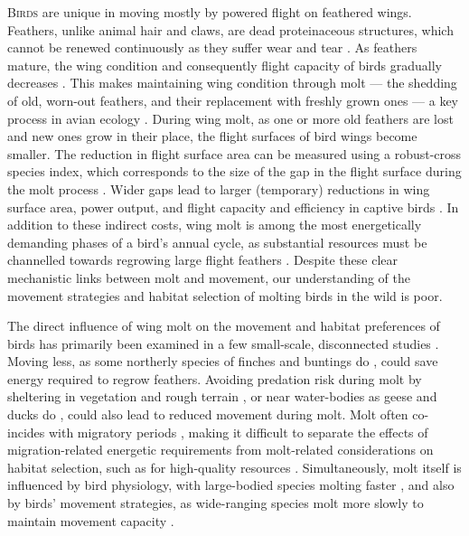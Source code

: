
\begin{refsection}

\newrefcontext[sorting=ynt]

\lettrine{B}{irds} are unique in moving mostly by powered flight on feathered wings.
Feathers, unlike animal hair and claws, are dead proteinaceous structures, which cannot be renewed continuously as they suffer wear and tear \cite{rayner1988,jenni1989}.
As feathers mature, the wing condition and consequently flight capacity of birds gradually decreases \cite{lindstrom1994,hedenstrom1999,hedenstrom2003}.
This makes maintaining wing condition through molt --- the shedding of old, worn-out feathers, and their replacement with freshly grown ones --- a key process in avian ecology \cite{ginn1983,rayner1988}.
During wing molt, as one or more old feathers are lost and new ones grow in their place, the flight surfaces of bird wings become smaller.
The reduction in flight surface area can be measured using a robust-cross species index, which corresponds to the size of the gap in the flight surface during the molt process \citep{lind2001,kiat2016}.
Wider gaps lead to larger (temporary) reductions in wing surface area, power output, and flight capacity and efficiency in captive birds \cite{tucker1991,swaddle1996,swaddle1997,williams2003,lind2001,lind2001a,bowlin2009}.
In addition to these indirect costs, wing molt is among the most energetically demanding phases of a bird's annual cycle, as substantial resources must be channelled towards regrowing large flight feathers \cite{lindstrom1993,newton2009,kiat2017}.
Despite these clear mechanistic links between molt and movement, our understanding of the movement strategies and habitat selection of molting birds in the wild is poor.

The direct influence of wing molt on the movement and habitat preferences of birds has primarily been examined in a few small-scale, disconnected studies \citep{bell1970,haukioja1971,green1975,francis1991,madsen1987,fox1998}.
Moving less, as some northerly species of finches and buntings do \citep{bell1970,haukioja1971,green1975,francis1991}, could save energy required to regrow feathers.
Avoiding predation risk during molt by sheltering in vegetation and rough terrain \citep{bell1970,haukioja1971,green1975,francis1991}, or near water-bodies as geese and ducks do \cite{madsen1987,fox1998}, could also lead to reduced movement during molt.
Molt often co-incides with migratory periods \citep{kiat2019}, making it difficult to separate the effects of migration-related energetic requirements \cite{alerstam1990,wikelski2003,horvitz2014} from molt-related considerations on habitat selection, such as for high-quality resources \cite{madsen1987,fox1998}.
Simultaneously, molt itself is influenced by bird physiology, with large-bodied species molting faster \citep{kiat2021,jenni2020}, and also by birds' movement strategies, as wide-ranging species molt more slowly to maintain movement capacity \cite{kiat2016}.


\end{refsection}
